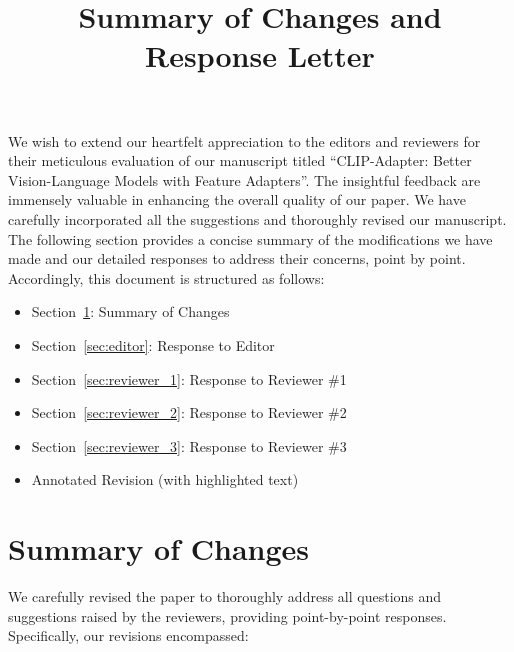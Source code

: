 \documentclass[default]{sn-jnl}%
\theoremstyle{thmstyleone}%
\theoremstyle{thmstyletwo}%
\theoremstyle{thmstylethree}%
\begin{document}
\title[]{Summary of Changes and Response Letter}



\maketitle


We wish to extend our heartfelt appreciation to the editors and reviewers for their meticulous evaluation of our manuscript titled ``CLIP-Adapter: Better Vision-Language Models with Feature Adapters''. The insightful feedback are immensely valuable in enhancing the overall quality of our paper. We have carefully incorporated all the suggestions and thoroughly revised our manuscript. The following section provides a concise summary of the modifications we have made and our detailed responses to address their concerns, point by point. Accordingly, this document is structured as follows:
\begin{itemize}
    \item Section~\ref{sec:summary}: Summary of Changes

    \item Section~\ref{sec:editor}: Response to Editor
    
    \item Section~\ref{sec:reviewer_1}: Response to Reviewer \#1
    
    \item Section~\ref{sec:reviewer_2}: Response to Reviewer \#2
    
    \item Section~\ref{sec:reviewer_3}: Response to Reviewer \#3
    
    \item Annotated Revision (with highlighted text)
\end{itemize}


\section{Summary of Changes}
\label{sec:summary}
We carefully revised the paper to thoroughly address all questions and suggestions raised by the reviewers, providing point-by-point responses. Specifically, our revisions encompassed:
\end{document}
